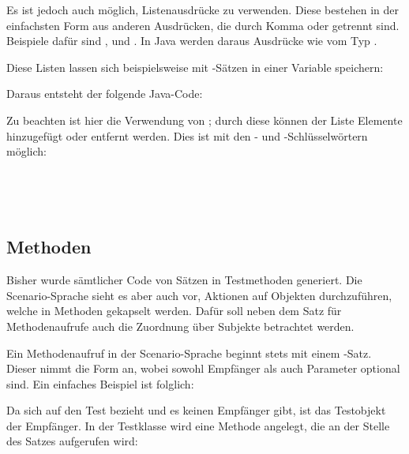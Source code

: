 Es ist jedoch auch möglich, Listenausdrücke zu verwenden.
Diese bestehen in der einfachsten Form aus anderen Ausdrücken, die durch Komma oder  getrennt sind.
Beispiele dafür sind ,  und .
In Java werden daraus Ausdrücke wie  vom Typ .

Diese Listen lassen sich beispielsweise mit -Sätzen in einer Variable speichern:


Daraus entsteht der folgende Java-Code:


Zu beachten ist hier die Verwendung von ;
durch diese können der Liste Elemente hinzugefügt oder entfernt werden.
Dies ist mit den - und -Schlüsselwörtern möglich:

\\

\\


\subsection{Methoden}\label{subsec:methods}

Bisher wurde sämtlicher Code von Sätzen in Testmethoden generiert.
Die Scenario-Sprache sieht es aber auch vor, Aktionen auf Objekten durchzuführen, welche in Methoden gekapselt werden.
Dafür soll neben dem Satz für Methodenaufrufe auch die Zuordnung über Subjekte betrachtet werden.

Ein Methodenaufruf in der Scenario-Sprache beginnt stets mit einem -Satz.
Dieser nimmt die Form  an, wobei sowohl Empfänger als auch Parameter optional sind.
Ein einfaches Beispiel ist folglich:


Da sich  auf den Test bezieht und es keinen Empfänger gibt, ist das Testobjekt der Empfänger.
In der Testklasse wird eine Methode  angelegt, die an der Stelle des Satzes aufgerufen wird:

